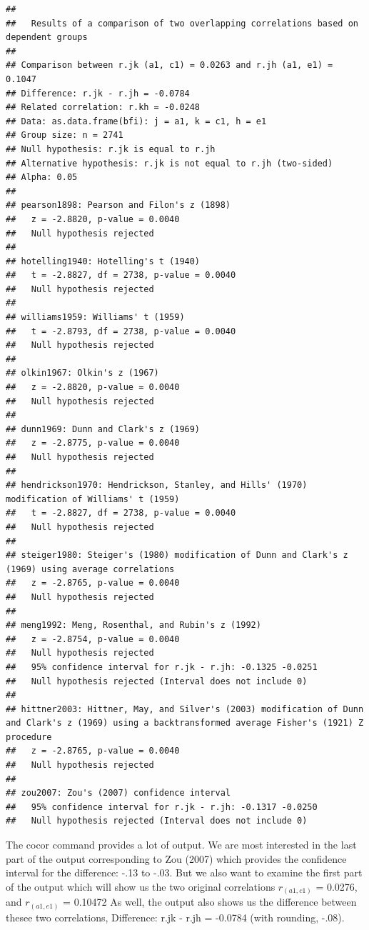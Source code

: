 \documentclass[
]{krantz}
\begin{document}
\begin{verbatim}
## 
##   Results of a comparison of two overlapping correlations based on dependent groups
## 
## Comparison between r.jk (a1, c1) = 0.0263 and r.jh (a1, e1) = 0.1047
## Difference: r.jk - r.jh = -0.0784
## Related correlation: r.kh = -0.0248
## Data: as.data.frame(bfi): j = a1, k = c1, h = e1
## Group size: n = 2741
## Null hypothesis: r.jk is equal to r.jh
## Alternative hypothesis: r.jk is not equal to r.jh (two-sided)
## Alpha: 0.05
## 
## pearson1898: Pearson and Filon's z (1898)
##   z = -2.8820, p-value = 0.0040
##   Null hypothesis rejected
## 
## hotelling1940: Hotelling's t (1940)
##   t = -2.8827, df = 2738, p-value = 0.0040
##   Null hypothesis rejected
## 
## williams1959: Williams' t (1959)
##   t = -2.8793, df = 2738, p-value = 0.0040
##   Null hypothesis rejected
## 
## olkin1967: Olkin's z (1967)
##   z = -2.8820, p-value = 0.0040
##   Null hypothesis rejected
## 
## dunn1969: Dunn and Clark's z (1969)
##   z = -2.8775, p-value = 0.0040
##   Null hypothesis rejected
## 
## hendrickson1970: Hendrickson, Stanley, and Hills' (1970) modification of Williams' t (1959)
##   t = -2.8827, df = 2738, p-value = 0.0040
##   Null hypothesis rejected
## 
## steiger1980: Steiger's (1980) modification of Dunn and Clark's z (1969) using average correlations
##   z = -2.8765, p-value = 0.0040
##   Null hypothesis rejected
## 
## meng1992: Meng, Rosenthal, and Rubin's z (1992)
##   z = -2.8754, p-value = 0.0040
##   Null hypothesis rejected
##   95% confidence interval for r.jk - r.jh: -0.1325 -0.0251
##   Null hypothesis rejected (Interval does not include 0)
## 
## hittner2003: Hittner, May, and Silver's (2003) modification of Dunn and Clark's z (1969) using a backtransformed average Fisher's (1921) Z procedure
##   z = -2.8765, p-value = 0.0040
##   Null hypothesis rejected
## 
## zou2007: Zou's (2007) confidence interval
##   95% confidence interval for r.jk - r.jh: -0.1317 -0.0250
##   Null hypothesis rejected (Interval does not include 0)
\end{verbatim}

The cocor command provides a lot of output. We are most interested in the last part of the output corresponding to Zou (2007) which provides the confidence interval for the difference: -.13 to -.03. But we also want to examine the first part of the output which will show us the two original correlations \(r_{(a1, c1)}\) = 0.0276, and \(r_{(a1, e1)}\) = 0.10472 As well, the output also shows us the difference between thesee two correlations, Difference: r.jk - r.jh = -0.0784 (with rounding, -.08).
\end{document}
